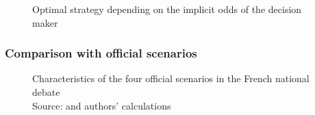 \begin{figure}[!h]
	\centering
	\caption{Optimal strategy depending on the implicit odds of the decision maker}
	\label{fig_app:odds}
\end{figure}


\clearpage
\subsubsection{Comparison with official scenarios}

\begin{figure}[!htp]
	\centering
	\caption{Characteristics of the four official scenarios in the French national debate \\Source: \citet{DNTE_gt2} and authors' calculations}
	\label{fig:DNTE_scenarios}
\end{figure}

